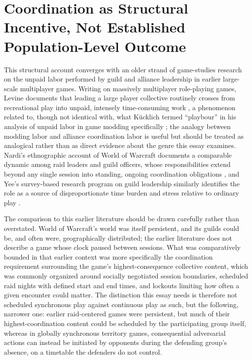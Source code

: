 \documentclass[11pt]{article}
\begin{document}
\section{Coordination as Structural Incentive, Not Established Population-Level Outcome}

This structural account converges with an older strand of game-studies research on the unpaid labor performed by guild and alliance leadership in earlier large-scale multiplayer games. Writing on massively multiplayer role-playing games, Levine documents that leading a large player collective routinely crosses from recreational play into unpaid, intensely time-consuming work \cite{levine2008}, a phenomenon related to, though not identical with, what K\"ucklich termed ``playbour'' in his analysis of unpaid labor in game modding specifically \cite{kucklich2005}; the analogy between modding labor and alliance coordination labor is useful but should be treated as analogical rather than as direct evidence about the genre this essay examines. Nardi's ethnographic account of World of Warcraft documents a comparable dynamic among raid leaders and guild officers, whose responsibilities extend beyond any single session into standing, ongoing coordination obligations \cite{nardi2010}, and Yee's survey-based research program on guild leadership similarly identifies the role as a source of disproportionate time burden and stress relative to ordinary play \cite{yee2006}.

The comparison to this earlier literature should be drawn carefully rather than overstated. World of Warcraft's world was itself persistent, and its guilds could be, and often were, geographically distributed; the earlier literature does not describe a game whose clock paused between sessions. What was comparatively bounded in that earlier context was more specifically the coordination requirement surrounding the game's highest-consequence collective content, which was commonly organized around socially negotiated session boundaries, scheduled raid nights with defined start and end times, and lockouts limiting how often a given encounter could matter. The distinction this essay needs is therefore not scheduled synchronous play against continuous play as such, but the following, narrower one: earlier raid-centered games were persistent, but much of their highest-coordination content could be scheduled by the participating group itself, whereas in globally synchronous territory games, consequential adversarial actions can instead be initiated by opponents during the defending group's absence, on a timetable the defenders do not control.
\end{document}
